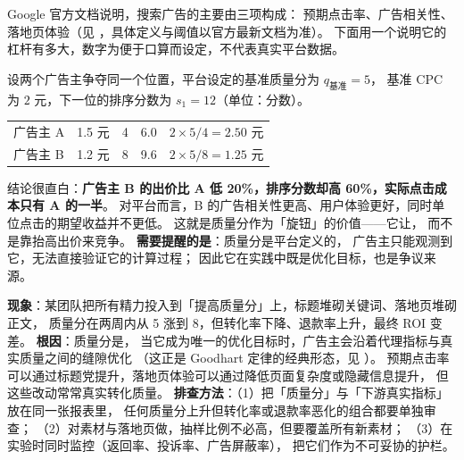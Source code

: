 \begin{casebox}
Google 官方文档说明，搜索广告的主要由三项构成：
预期点击率、广告相关性、落地页体验（见 \cite{google2024quality}，具体定义与阈值以官方最新文档为准）。
下面用一个说明它的杠杆有多大，数字为便于口算而设定，不代表真实平台数据。

设两个广告主争夺同一个位置，平台设定的基准质量分为 $q_{\text{基准}} = 5$，
基准 CPC 为 $2$ 元，下一位的排序分数为 $s_1 = 12$（单位：分数）。
\begin{center}
\small
\begin{tabularx}{\linewidth}{L{2.4cm} L{1.8cm} L{2.2cm} L{2.4cm} Y}
\toprule
{} &  &  &  &  \\
\midrule
广告主 A & 1.5 元 & 4 & 6.0 & $2 \times 5/4 = 2.50$ 元 \\
\addlinespace
广告主 B & 1.2 元 & 8 & 9.6 & $2 \times 5/8 = 1.25$ 元 \\
\bottomrule
\end{tabularx}
\label{tab:qs-demo}
\end{center}
结论很直白：\textbf{广告主 B 的出价比 A 低 20\%，排序分数却高 60\%，实际点击成本只有 A 的一半}。
对平台而言，B 的广告相关性更高、用户体验更好，同时单位点击的期望收益并不更低。
这就是质量分作为「旋钮」的价值——它让，
而不是靠抬高出价来竞争。
\textbf{需要提醒的是}：质量分是平台定义的，
广告主只能观测到它，无法直接验证它的计算过程；
因此它在实践中既是优化目标，也是争议来源。
\end{casebox}

\begin{pitfall}
\textbf{现象}：某团队把所有精力投入到「提高质量分」上，标题堆砌关键词、落地页堆砌正文，
质量分在两周内从 5 涨到 8，但转化率下降、退款率上升，最终 ROI 变差。
\textbf{根因}：质量分是，
当它成为唯一的优化目标时，广告主会沿着代理指标与真实质量之间的缝隙优化
（这正是 Goodhart 定律的经典形态，见 \cite{goodhart1975}）。
预期点击率可以通过标题党提升，落地页体验可以通过降低页面复杂度或隐藏信息提升，
但这些改动常常真实转化质量。
\textbf{排查方法}：（1）把「质量分」与「下游真实指标」放在同一张报表里，
任何质量分上升但转化率或退款率恶化的组合都要单独审查；
（2）对素材与落地页做，抽样比例不必高，但要覆盖所有新素材；
（3）在实验时同时监控（返回率、投诉率、广告屏蔽率），
把它们作为不可妥协的护栏。
\end{pitfall}

